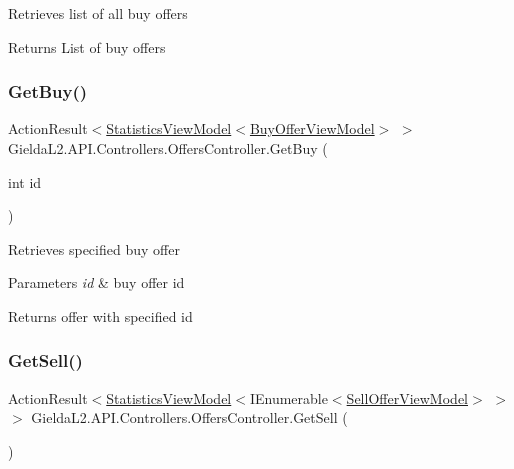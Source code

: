 Retrieves list of all buy offers 

\begin{DoxyReturn}{Returns}
List of buy offers
\end{DoxyReturn}
\mbox{\label{class_gielda_l2_1_1_a_p_i_1_1_controllers_1_1_offers_controller_a1310ed7960becb921d6b9285ae375c95}} 
\subsubsection{\texorpdfstring{GetBuy()}{GetBuy()}\hspace{0.1cm}{\footnotesize\ttfamily [2/2]}}
{\footnotesize\ttfamily Action\+Result$<$\mbox{\hyperlink{class_gielda_l2_1_1_a_p_i_1_1_view_models_1_1_view_1_1_statistics_view_model}{Statistics\+View\+Model}}$<$\mbox{\hyperlink{class_gielda_l2_1_1_a_p_i_1_1_view_models_1_1_view_1_1_buy_offer_view_model}{Buy\+Offer\+View\+Model}}$>$ $>$ Gielda\+L2.\+A\+P\+I.\+Controllers.\+Offers\+Controller.\+Get\+Buy (\begin{DoxyParamCaption}\item[{int}]{id }\end{DoxyParamCaption})}



Retrieves specified buy offer 


\begin{DoxyParams}{Parameters}
{\em id} & buy offer id\\
\hline
\end{DoxyParams}
\begin{DoxyReturn}{Returns}
offer with specified id
\end{DoxyReturn}
\mbox{\label{class_gielda_l2_1_1_a_p_i_1_1_controllers_1_1_offers_controller_a9ac2f421d868e7f0583c2b43368b5a28}} 
\subsubsection{\texorpdfstring{GetSell()}{GetSell()}\hspace{0.1cm}{\footnotesize\ttfamily [1/2]}}
{\footnotesize\ttfamily Action\+Result$<$\mbox{\hyperlink{class_gielda_l2_1_1_a_p_i_1_1_view_models_1_1_view_1_1_statistics_view_model}{Statistics\+View\+Model}}$<$I\+Enumerable$<$\mbox{\hyperlink{class_gielda_l2_1_1_a_p_i_1_1_view_models_1_1_view_1_1_sell_offer_view_model}{Sell\+Offer\+View\+Model}}$>$ $>$ $>$ Gielda\+L2.\+A\+P\+I.\+Controllers.\+Offers\+Controller.\+Get\+Sell (\begin{DoxyParamCaption}{ }\end{DoxyParamCaption})}



